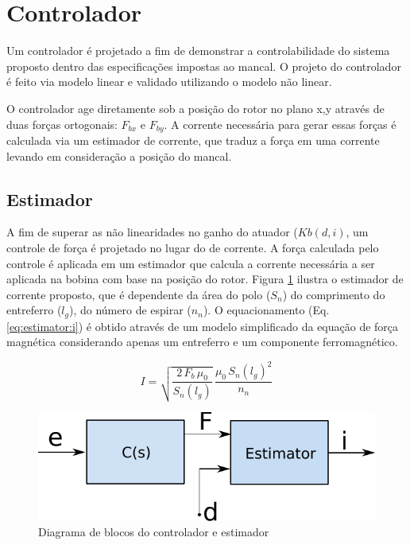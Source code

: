 

\section{Controlador}

Um controlador é projetado a fim de demonstrar a controlabilidade do sistema proposto dentro das especificações impostas ao mancal. O projeto do controlador é feito via modelo linear e validado utilizando o modelo não linear. 

O controlador age diretamente sob a posição do rotor no plano x,y através de duas forças ortogonais: $F_{bx}$ e $F_{by}$. A corrente necessária para gerar essas forças é calculada via um estimador de corrente, que traduz a força em uma corrente levando em consideração a posição do mancal.

\subsection{Estimador}
	
A fim de superar as não linearidades no ganho do atuador ($Kb(d,i)$, um controle de força é projetado no lugar do de corrente. A força calculada pelo controle é aplicada em um estimador que calcula a corrente necessária a ser aplicada na bobina com base na posição do rotor. Figura \ref{fig:diagrama_controlador_estimador} ilustra o estimador de corrente proposto, que é dependente da área do polo ($S_n$) do comprimento do entreferro ($l_g$), do número de espirar ($n_n$). O equacionamento (Eq. \eqref{eq:estimator:i}) é obtido através de um modelo simplificado da equação de força magnética considerando apenas um entreferro e um componente ferromagnético.

	
\begin{equation}
I = \sqrt{\frac{2 \, F_b \, \mu_0}{S_n(l_g)}} \, \frac{\mu_0 \, S_n(l_g)^2}{n_n}
\label{eq:estimator:i}
\end{equation}
	
\begin{figure}[ht!]
	\centering
	\includegraphics[width=0.5\linewidth]{Figs/Modelagem/controlador_estimador}
	\caption{Diagrama de blocos do controlador e estimador}
	\label{fig:diagrama_controlador_estimador}
\end{figure}

